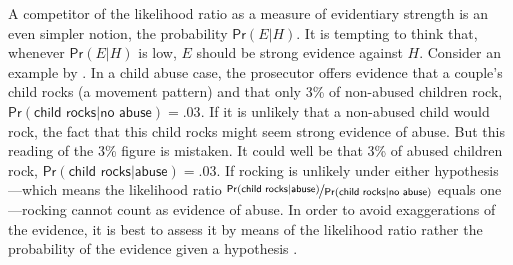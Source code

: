 \documentclass{article}
\newcommand{\pr}{\mathsf{Pr}}
\begin{document}
A competitor of the likelihood ratio as a measure of evidentiary strength is an even simpler notion, the probability $\pr(E \vert H)$. It is tempting to think that, whenever $\pr(E \vert H)$ is low, 
$E$ should be strong evidence against 
$H$. 
Consider an example by \cite{robertson2016interpreting}. In a child abuse case, the prosecutor offers evidence that a couple's child rocks (a movement pattern) and that only 3\% of non-abused children rock, $\pr(\textsf{child rocks} \vert \textsf{no abuse})=.03$. If it is unlikely that a non-abused child would rock, the fact that this child rocks might seem strong evidence of abuse. But this reading of the 3\% figure is mistaken. It could well be that 
3\% of abused children rock, $\pr(\textsf{child rocks} \vert \textsf{abuse})=.03$. 
If rocking is unlikely under either hypothesis---which means the likelihood ratio 
 $\nicefrac{\pr(\textsf{child rocks} \vert \textsf{abuse})}{\pr(\textsf{child rocks} \vert \textsf{no abuse})}$ equals one---rocking cannot count as evidence of abuse. In order to avoid exaggerations of the evidence, it is best to assess it by means of the likelihood ratio rather the probability of the evidence given a hypothesis  \citep{Royall1997, triggsCommentWhyEffecta, enfs2015}. 
\end{document}
